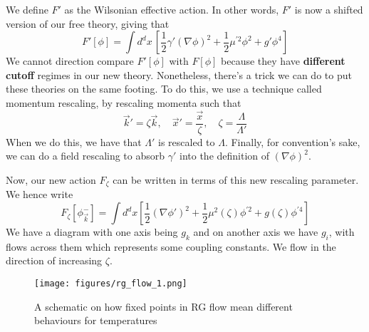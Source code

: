 We define $ F' $ as the Wilsonian effective action.
In other words, 
$ F '$  is now a shifted version of our free theory, giving that 
\[
	F ' [ \phi ] = \int d^ d x \, \left[  \frac{1}{2 } \gamma ' ( \nabla \phi ) ^ 2 + \frac{1}{2 } \mu^{ ' 2 } \phi ^ 2 + g ' \phi ^ 4  \right] 
\] We cannot direction compare $ F ' [ \phi ] $ with $ F [ \phi ] $
because they have  \textbf{different cutoff } regimes in 
our new theory. 
Nonetheless, there's a trick we can do to put 
these theories on the same footing. 
To do this, we use a technique called 
momentum rescaling, by rescaling momenta such that 
\[
 \vec{k} ' = \zeta \vec{k}, \quad \vec{x} ' = \frac{\vec{x} }{ \zeta }, \quad \zeta = \frac{ \Lambda }{ \Lambda ' } 
\] When we do this, we have that $ \Lambda' $ is rescaled to $ \Lambda$. 
Finally, for convention's sake, we can do a field rescaling to 
absorb  $ \gamma ' $ into the definition of $ (  \nabla \phi ) ^ 2 $. 

Now, our new action $ F_{ \zeta } $ can be written in terms of this new 
rescaling parameter. We hence write 
\[
	F_{ \zeta } [ \phi_{ \vec{k} } ^ - ] = \int d^ d x \left[  \frac{1}{2 } ( \nabla \phi' ) ^ 2 + \frac{1}{2 } \mu ^ 2 ( \zeta ) \phi ^{ ' 2 } + g ( \zeta ) \phi ^{ ' 4 }  \right] 
\] We have a diagram with one axis being $ g_k $ and on another axis we 
have $ g_ i $, with flows across them which represents some coupling constants. 
We flow in the direction of increasing $ \zeta  $. 

\begin{figure}[h]
	\centering
	\texttt{[image: figures/rg\_flow\_1.png]}
	\caption{A schematic on how fixed points in RG flow mean different behaviours for temperatures}
\end{figure}

